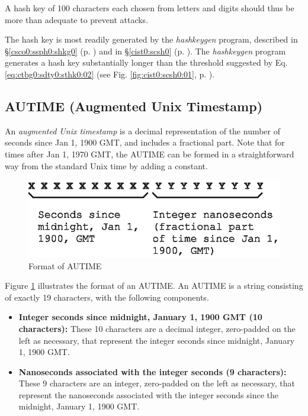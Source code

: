A hash key of 100 characters each chosen from letters and digits
should thus be more than adequate to prevent attacks.

The hash key is most readily generated by the 
\emph{hashkeygen} program,
described in \S{}\ref{csco0:ssph0:shkg0} (p. \pageref{csco0:ssph0:shkg0})
and in \S{}\ref{cist0:scsh0} (p. \pageref{cist0:scsh0}).
The \emph{hashkeygen} program generates a hash key substantially
longer than the threshold suggested
by Eq. \ref{eq:ctbg0:sdty0:sthk0:02} (see 
Fig. \ref{fig:cist0:scsh0:01}, p. \pageref{fig:cist0:scsh0:01}).


\subsection{AUTIME (Augmented Unix Timestamp)}
\label{ctbg0:sdty0:sati0}

%
An \emph{augmented Unix timestamp} is a decimal representation of the number of
seconds since Jan 1, 1900 GMT, and includes a fractional part.  Note that for times
after Jan 1, 1970 GMT, the AUTIME can be formed in a straightforward way from
the standard Unix time by adding a constant.

\begin{figure}
\centering
\includegraphics[width=4.6in]{c_tbg0/autimeformat01.eps}
\caption{Format of AUTIME}
\label{fig:ctbg0:sdty0:sati0:00}
\end{figure}

Figure \ref{fig:ctbg0:sdty0:sati0:00} illustrates the format of
an AUTIME\@.  An AUTIME is a string consisting
of exactly 19 characters, with the following
components.

\begin{itemize}
\item \textbf{Integer seconds since midnight, January 1, 1900 GMT (10 characters):}
      These 10 characters are a decimal integer, zero-padded on the left as
      necessary, that represent the integer seconds since midnight, January 1,
      1900 GMT.
\item \textbf{Nanoseconds associated with the integer seconds (9 characters):}
      These 9 characters are an integer, zero-padded on the left as
      necessary, that represent the nanoseconds associated with the
      integer seconds since the midnight, January 1, 1900 GMT.  
\end{itemize}

